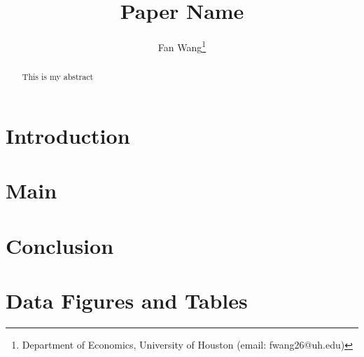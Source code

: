 \documentclass[12pt,english]{article}
\begin{document}
\title{Paper Name}

\author{Fan Wang\thanks{Department of Economics, University of Houston (email: fwang26@uh.edu)}}

\maketitle
\begin{abstract}
\singlespacing This is my abstract \end{abstract}
\vfill
\pagebreak{}

\section{Introduction}

\section{Main}

\section{Conclusion}

\pagebreak

\pagebreak

\appendix
\section{Data Figures and Tables}
\end{document}
